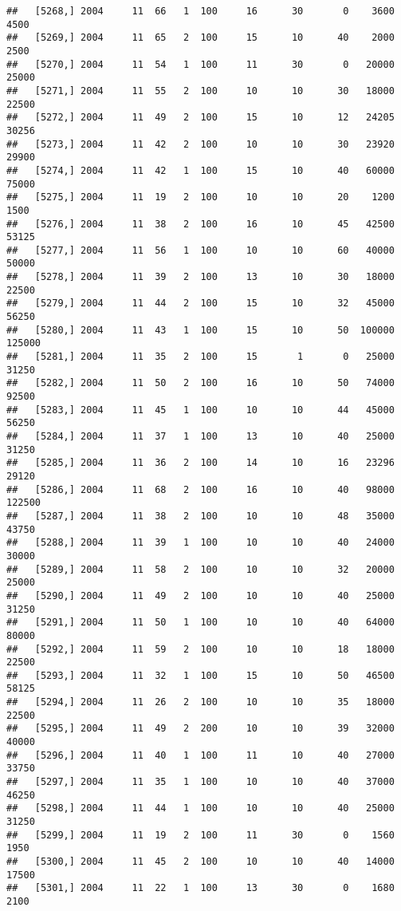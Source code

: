 \documentclass{article}\usepackage[]{graphicx}\usepackage[]{color}
\makeatletter
\newenvironment{kframe}{%
 \def\at@end@of@kframe{}%
 \ifinner\ifhmode%
  \def\at@end@of@kframe{\end{minipage}}%
  \begin{minipage}{\columnwidth}%
 \fi\fi%
 \def\FrameCommand##1{\hskip\@totalleftmargin \hskip-\fboxsep
 \colorbox{shadecolor}{##1}\hskip-\fboxsep
     \hskip-\linewidth \hskip-\@totalleftmargin \hskip\columnwidth}%
 \MakeFramed {\advance\hsize-\width
   \@totalleftmargin\z@ \linewidth\hsize
   \@setminipage}}%
 {\par\unskip\endMakeFramed%
 \at@end@of@kframe}
\newenvironment{knitrout}{}{} %
\makeatother
\begin{document}
\begin{knitrout}
\begin{kframe}
\begin{verbatim}
##   [5268,] 2004     11  66   1  100     16      30       0    3600    4500
##   [5269,] 2004     11  65   2  100     15      10      40    2000    2500
##   [5270,] 2004     11  54   1  100     11      30       0   20000   25000
##   [5271,] 2004     11  55   2  100     10      10      30   18000   22500
##   [5272,] 2004     11  49   2  100     15      10      12   24205   30256
##   [5273,] 2004     11  42   2  100     10      10      30   23920   29900
##   [5274,] 2004     11  42   1  100     15      10      40   60000   75000
##   [5275,] 2004     11  19   2  100     10      10      20    1200    1500
##   [5276,] 2004     11  38   2  100     16      10      45   42500   53125
##   [5277,] 2004     11  56   1  100     10      10      60   40000   50000
##   [5278,] 2004     11  39   2  100     13      10      30   18000   22500
##   [5279,] 2004     11  44   2  100     15      10      32   45000   56250
##   [5280,] 2004     11  43   1  100     15      10      50  100000  125000
##   [5281,] 2004     11  35   2  100     15       1       0   25000   31250
##   [5282,] 2004     11  50   2  100     16      10      50   74000   92500
##   [5283,] 2004     11  45   1  100     10      10      44   45000   56250
##   [5284,] 2004     11  37   1  100     13      10      40   25000   31250
##   [5285,] 2004     11  36   2  100     14      10      16   23296   29120
##   [5286,] 2004     11  68   2  100     16      10      40   98000  122500
##   [5287,] 2004     11  38   2  100     10      10      48   35000   43750
##   [5288,] 2004     11  39   1  100     10      10      40   24000   30000
##   [5289,] 2004     11  58   2  100     10      10      32   20000   25000
##   [5290,] 2004     11  49   2  100     10      10      40   25000   31250
##   [5291,] 2004     11  50   1  100     10      10      40   64000   80000
##   [5292,] 2004     11  59   2  100     10      10      18   18000   22500
##   [5293,] 2004     11  32   1  100     15      10      50   46500   58125
##   [5294,] 2004     11  26   2  100     10      10      35   18000   22500
##   [5295,] 2004     11  49   2  200     10      10      39   32000   40000
##   [5296,] 2004     11  40   1  100     11      10      40   27000   33750
##   [5297,] 2004     11  35   1  100     10      10      40   37000   46250
##   [5298,] 2004     11  44   1  100     10      10      40   25000   31250
##   [5299,] 2004     11  19   2  100     11      30       0    1560    1950
##   [5300,] 2004     11  45   2  100     10      10      40   14000   17500
##   [5301,] 2004     11  22   1  100     13      30       0    1680    2100

\end{verbatim}
\end{kframe}
\end{knitrout}
\end{document}
